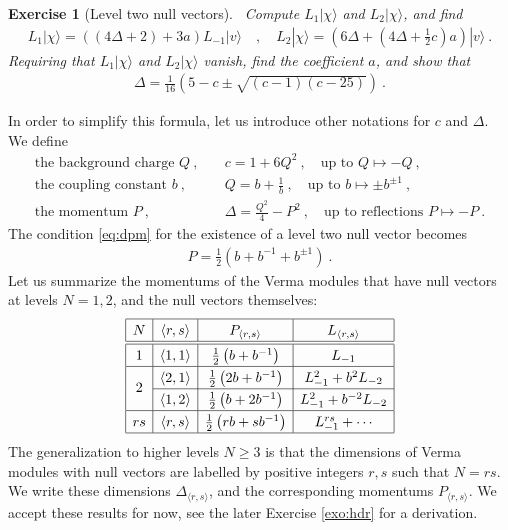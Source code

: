 \documentclass[12pt, a4paper]{article}
\theoremstyle{break}
\newtheorem{exo}{Exercise}[section]
\begin{document}
\begin{exo}[Level two null vectors]
 ~\label{exo:level2}
 Compute  $L_1|\chi\rangle$ and $L_2|\chi\rangle$, and find 
 \begin{align}
  L_1 |\chi\rangle = \left((4\Delta+2) + 3a\right) L_{-1}|v\rangle
  \quad , \quad L_2 |\chi\rangle= \left(6\Delta + (4\Delta +\tfrac12 c)a\right) |v\rangle\ .
 \end{align}
 Requiring that $L_1|\chi\rangle$ and $L_2|\chi\rangle$ vanish, find the coefficient $a$, and show that
 \begin{align}
 \Delta = \frac{1}{16}\left( 5-c\pm\sqrt{(c-1)(c-25)} \right) \ .
 \label{eq:dpm}
\end{align}
\end{exo}
In order to simplify this formula, let us introduce other notations for $c$ and $\Delta$. We define
\begin{align}
 \text{the background charge } Q \ , & \quad c = 1+6Q^2\ , \quad \text{up to } Q \mapsto -Q\ ,
 \label{eq:cqb}
 \\
 \text{the coupling constant } b \ , & \quad Q = b+\frac{1}{b} \ , \quad \text{up to } b\mapsto \pm b^{\pm 1}\ ,
 \\
 \text{the momentum } P\  , &\quad \Delta = \frac{Q^2}{4}-P^2\ , \quad \text{up to reflections } P \mapsto -P\ .
\label{eq:refm}
 \end{align}
The condition \eqref{eq:dpm} for the existence of a level two null vector becomes 
\begin{align}
 P = \frac12\left( b+ b^{-1} + b^{\pm 1}\right)\ .
\end{align}
Let us summarize the momentums of the Verma modules that have null vectors at levels $N=1,2$, and the null vectors themselves:
\begin{align}
\renewcommand{\arraystretch}{1.3}
\begin{array}{|c|c|c|c|}
\hline 
N & \langle r,s\rangle & P_{\langle r,s\rangle} &  L_{\langle r,s\rangle} 
\\
\hline\hline
1 & \langle 1,1\rangle & \frac12\left(b+b^{-1}\right) &  L_{-1}
\\
\hline
\multirow{2}{*}{2} & 
\langle 2,1\rangle & \frac12\left( 2b+ b^{-1}\right)  & L_{-1}^2 + b^2 L_{-2}
\\
\cline{2-4}
& \langle 1,2\rangle & \frac12\left( b+ 2b^{-1} \right) & L_{-1}^2 + b^{-2} L_{-2} 
\\
\hline
rs & \langle r,s\rangle &  \frac12\left(rb+sb^{-1}\right) & L_{-1}^{rs} + \cdots 
\\
\hline
\end{array}
\label{eq:ars}
\end{align}
The generalization to higher levels $N\geq 3$ is that the dimensions of Verma modules with null vectors are labelled by positive integers $r,s$ such that $N=rs$. We write these dimensions $\Delta_{\langle r,s\rangle}$, and the corresponding momentums $P_{\langle r,s\rangle}$. We accept these results for now, see the later Exercise \ref{exo:hdr} for a derivation.
\end{document}
